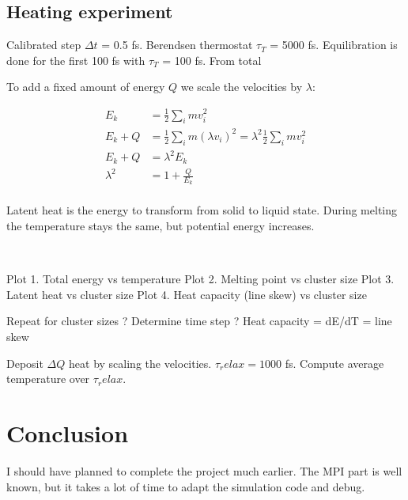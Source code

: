 \documentclass[12pt,a4paper]{article}
\newcommand{\framed}[1]{\tikz[baseline=(char.base)]{\node[shape=rectangle,draw,inner sep=4pt] (char) {#1};}}
\begin{document}
\subsection*{Heating experiment}

Calibrated step $\Delta t$ = 0.5 fs. Berendsen thermostat $\tau_T$ = 5000 fs. Equilibration is done for the first 100 fs with $\tau_T$ = 100 fs. From total 

To add a fixed amount of energy $Q$ we scale the velocities by $\lambda$:

\[
\begin{aligned}
	E_k &= \frac{1}{2} \sum_i m v_i^2 \\
	E_k + Q &= \frac{1}{2} \sum_i m (\lambda v_i)^2 = \lambda^2 \frac{1}{2} \sum_i m v_i^2 \\
	E_k + Q &= \lambda^2 E_k \\
	\lambda^2 &= 1 + \frac{Q}{E_k} \\
\end{aligned}
\]

Latent heat is the energy to transform from solid to liquid state. During melting the temperature stays the same, but potential energy increases.

{\centering\framed{ \( \lambda = \sqrt{1 + \frac{Q}{E_k}} \) }\\}

Plot 1. Total energy vs temperature
Plot 2. Melting point vs cluster size
Plot 3. Latent heat vs cluster size
Plot 4. Heat capacity (line skew) vs cluster size

Repeat for cluster sizes ?
Determine time step ?
Heat capacity = dE/dT = line skew

Deposit $\Delta Q$ heat by scaling the velocities. $\tau_relax = 1000$ fs. Compute average temperature over $\tau_relax$.



\section{Conclusion}
\label{conclusion}

I should have planned to complete the project much earlier. The MPI part is well known, but it takes a lot of time to adapt the simulation code and debug.

\newpage
{\small
	
	
}
\end{document}
